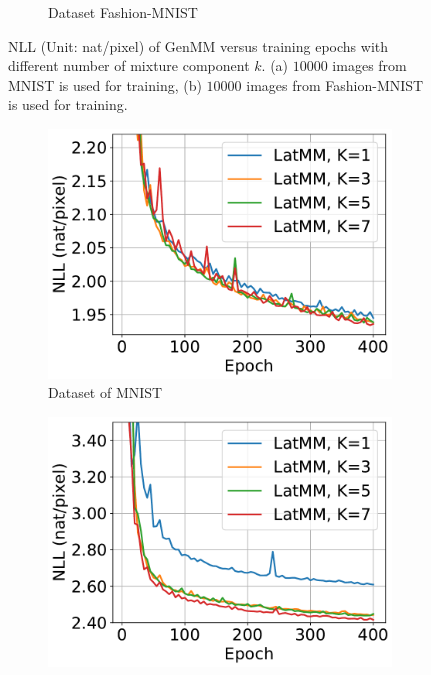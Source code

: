 \begin{figure}[!ht]
\begin{subfigure}{.4\textwidth}
    \vspace{-0.6cm}
    \caption{Dataset Fashion-MNIST}
    \label{fig-genmm-fsh-nll-curve}
  \end{subfigure}
  \vspace{-0.3cm}
  \caption{NLL (Unit: nat/pixel) of GenMM versus training epochs with different number of mixture component $k$. (a) $10000$ images from MNIST is used for training, (b) $10000$ images from Fashion-MNIST is used for training.}
  \label{fig:genmm-nll}
\end{figure}

\begin{figure}[!ht]
  \captionsetup[subfigure]{justification=centering}
  \centering
  \begin{subfigure}{.4\textwidth}
    \centering
    \includegraphics[width=1\linewidth]{images/supply/mnist_LatMM_nll_curves-crop.pdf}
    \vspace{-0.6cm}
    \caption{Dataset of MNIST}
    \label{fig-latmm-mnist-nll-curve}
  \end{subfigure}\hspace{1cm}
  \begin{subfigure}{.4\textwidth}
    \centering
    \includegraphics[width=1\linewidth]{images/supply/fashion_LatMM_nll_curves-crop.pdf}

\end{subfigure}
\end{figure}
